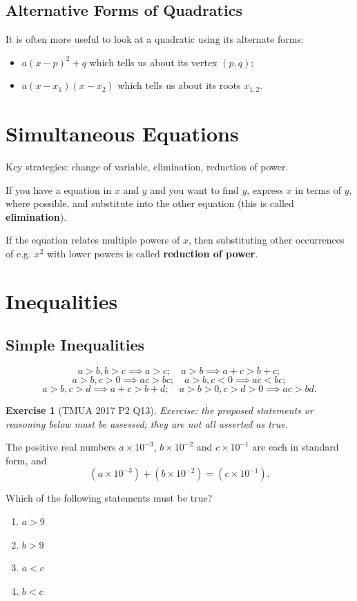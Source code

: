 \documentclass[11pt]{article}
\theoremstyle{definition}
\newtheorem{example}[theorem]{Exercise}
\theoremstyle{remark}
\newcommand{\pqty}[1]{\left(#1\right)}
\begin{document}
\subsection{Alternative Forms of Quadratics}\label{tmua-1-subsection-006}
It is often more useful to look at a quadratic using its alternate forms:
\begin{itemize}
    \item \(a \pqty{x - p}^2 + q\) which tells us about its vertex \(\pqty{p, q}\);
    \item \(a \pqty{x - x_1} \pqty{x - x_2}\) which tells us about its roots \(x_{1, 2}\).
\end{itemize}

\section{Simultaneous Equations}\label{tmua-1-section-006}

Key strategies: change of variable, elimination, reduction of power.

If you have a equation in \(x\) and \(y\) and you want to find \(y\), express \(x\) in terms of \(y\), where possible, and substitute into the other equation (this is called \textbf{elimination}).

If the equation relates multiple powers of \(x\), then substituting other occurrences of e.g. \(x^2\) with lower powers is called \textbf{reduction of power}.

\section{Inequalities}\label{tmua-1-section-007}
\subsection{Simple Inequalities}\label{tmua-1-subsection-007}
\[
    a > b, b > c \implies a > c; \quad a > b \implies a + c > b + c;
\]
\[
    a > b, c > 0 \implies ac > bc; \quad a > b, c < 0 \implies ac < bc;
\]
\[
    a > b, c > d \implies a + c > b + d; \quad a > b > 0, c > d > 0 \implies ac > bd.
\]

\begin{example}[TMUA 2017 P2 Q13]\label{tmua-1-unit-020}
\textit{Exercise: the proposed statements or reasoning below must be assessed; they are not all asserted as true.}\par

    The positive real numbers \(a \times 10^{-3}\), \(b \times 10^{-2}\) and \(c \times 10^{-1}\) are each in standard form, and
    \[
        \pqty{a \times 10^{-3}} + \pqty{b \times 10^{-2}} = \pqty{c \times 10^{-1}}.
    \]

    Which of the following statements must be true?
    \begin{enumerate}
        \item \(a > 9\)
        \item \(b > 9\)
        \item \(a < c\)
        \item \(b < c\)
    \end{enumerate}
\end{example}
\end{document}
